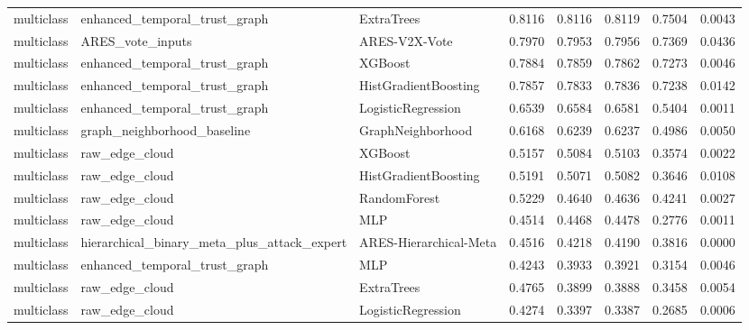 \begin{table}[!t]
{\begin{tabular}{lllrrrrr}
multiclass & enhanced_temporal_trust_graph & ExtraTrees & 0.8116 & 0.8116 & 0.8119 & 0.7504 & 0.0043 \\
multiclass & ARES_vote_inputs & ARES-V2X-Vote & 0.7970 & 0.7953 & 0.7956 & 0.7369 & 0.0436 \\
multiclass & enhanced_temporal_trust_graph & XGBoost & 0.7884 & 0.7859 & 0.7862 & 0.7273 & 0.0046 \\
multiclass & enhanced_temporal_trust_graph & HistGradientBoosting & 0.7857 & 0.7833 & 0.7836 & 0.7238 & 0.0142 \\
multiclass & enhanced_temporal_trust_graph & LogisticRegression & 0.6539 & 0.6584 & 0.6581 & 0.5404 & 0.0011 \\
multiclass & graph_neighborhood_baseline & GraphNeighborhood & 0.6168 & 0.6239 & 0.6237 & 0.4986 & 0.0050 \\
multiclass & raw_edge_cloud & XGBoost & 0.5157 & 0.5084 & 0.5103 & 0.3574 & 0.0022 \\
multiclass & raw_edge_cloud & HistGradientBoosting & 0.5191 & 0.5071 & 0.5082 & 0.3646 & 0.0108 \\
multiclass & raw_edge_cloud & RandomForest & 0.5229 & 0.4640 & 0.4636 & 0.4241 & 0.0027 \\
multiclass & raw_edge_cloud & MLP & 0.4514 & 0.4468 & 0.4478 & 0.2776 & 0.0011 \\
multiclass & hierarchical_binary_meta_plus_attack_expert & ARES-Hierarchical-Meta & 0.4516 & 0.4218 & 0.4190 & 0.3816 & 0.0000 \\
multiclass & enhanced_temporal_trust_graph & MLP & 0.4243 & 0.3933 & 0.3921 & 0.3154 & 0.0046 \\
multiclass & raw_edge_cloud & ExtraTrees & 0.4765 & 0.3899 & 0.3888 & 0.3458 & 0.0054 \\
multiclass & raw_edge_cloud & LogisticRegression & 0.4274 & 0.3397 & 0.3387 & 0.2685 & 0.0006 \\
\bottomrule
\end{tabular}

}
\end{table}